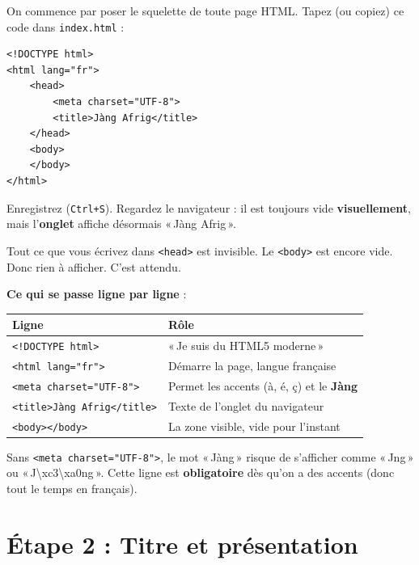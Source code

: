 \documentclass[11pt,a4paper]{article}
\newcommand{\cmark}{\ding{51}}
\begin{document}
On commence par poser le squelette de toute page HTML. Tapez (ou copiez)
ce code dans \texttt{index.html} :

\begin{lstlisting}[language=HTML5]
<!DOCTYPE html>
<html lang="fr">
    <head>
        <meta charset="UTF-8">
        <title>Jàng Afrig</title>
    </head>
    <body>
    </body>
</html>
\end{lstlisting}

Enregistrez (\texttt{Ctrl+S}). Regardez le navigateur : il est toujours
vide \textbf{visuellement}, mais l'\textbf{onglet} affiche désormais
«\,Jàng Afrig\,». \cmark

\begin{infobox}
Tout ce que vous écrivez dans \texttt{<head>} est invisible. Le \texttt{<body>}
est encore vide. Donc rien à afficher. C'est attendu.
\end{infobox}

\textbf{Ce qui se passe ligne par ligne} :

\begin{center}
\begin{tabular}{@{}lp{8.5cm}@{}}
\toprule
\textbf{Ligne} & \textbf{Rôle} \\
\midrule
\texttt{<!DOCTYPE html>} & «\,Je suis du HTML5 moderne\,» \\
\texttt{<html lang="fr">} & Démarre la page, langue française \\
\texttt{<meta charset="UTF-8">} & Permet les accents (à, é, ç) et le \textbf{Jàng} \\
\texttt{<title>Jàng Afrig</title>} & Texte de l'onglet du navigateur \\
\texttt{<body></body>} & La zone visible, vide pour l'instant \\
\bottomrule
\end{tabular}
\end{center}

\begin{attentionbox}
Sans \texttt{<meta charset="UTF-8">}, le mot «\,Jàng\,» risque de s'afficher
comme «\,Jng\,» ou «\,J\textbackslash xc3\textbackslash xa0ng\,». Cette ligne est
\textbf{obligatoire} dès qu'on a des accents (donc tout le temps en
français).
\end{attentionbox}

\section{Étape 2 : Titre et présentation}
\end{document}
